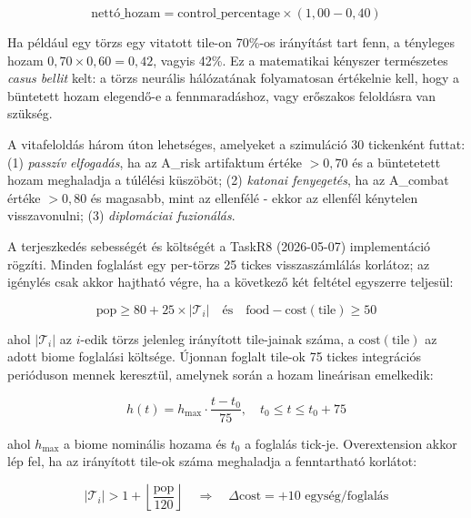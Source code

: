 \begin{equation}
\text{nettó\_hozam} = \text{control\_percentage} \times (1{,}00 - 0{,}40)
\end{equation}

Ha például egy törzs egy vitatott tile-on 70\%-os irányítást tart fenn, a tényleges hozam $0{,}70 \times 0{,}60 = 0{,}42$, vagyis 42\%. Ez a matematikai kényszer természetes \textit{casus bellit} kelt: a törzs neurális hálózatának folyamatosan értékelnie kell, hogy a büntetett hozam elegendő-e a fennmaradáshoz, vagy erőszakos feloldásra van szükség.

A vitafeloldás három úton lehetséges, amelyeket a szimuláció 30 tickenként futtat: (1) \textit{passzív elfogadás}, ha az A\_risk artifaktum értéke $> 0{,}70$ és a büntetetett hozam meghaladja a túlélési küszöböt; (2) \textit{katonai fenyegetés}, ha az A\_combat értéke $> 0{,}80$ és magasabb, mint az ellenfélé - ekkor az ellenfél kénytelen visszavonulni; (3) \textit{diplomáciai fuzionálás}.

A terjeszkedés sebességét és költségét a TaskR8 (2026-05-07) implementáció rögzíti.
Minden foglalást egy per-törzs 25 tickes visszaszámlálás korlátoz; az igénylés csak
akkor hajtható végre, ha a következő két feltétel egyszerre teljesül:

\begin{equation}
\text{pop} \geq 80 + 25 \times |\mathcal{T}_i|
\quad \text{és} \quad
\text{food} - \text{cost}(\text{tile}) \geq 50
\end{equation}

ahol $|\mathcal{T}_i|$ az $i$-edik törzs jelenleg irányított tile-jainak száma,
a $\text{cost}(\text{tile})$ az adott biome foglalási költsége.
Újonnan foglalt tile-ok 75 tickes integrációs perióduson mennek keresztül,
amelynek során a hozam lineárisan emelkedik:

\begin{equation}
h(t) = h_{\max} \cdot \frac{t - t_0}{75}, \quad t_0 \leq t \leq t_0 + 75
\end{equation}

ahol $h_{\max}$ a biome nominális hozama és $t_0$ a foglalás tick-je.
Overextension akkor lép fel, ha az irányított tile-ok száma meghaladja
a fenntartható korlátot:

\begin{equation}
|\mathcal{T}_i| > 1 + \left\lfloor \frac{\text{pop}}{120} \right\rfloor
\quad \Rightarrow \quad \Delta\text{cost} = +10 \text{ egység/foglalás}
\end{equation}

